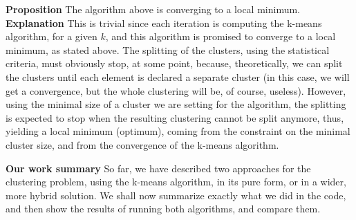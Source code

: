 \documentclass[12pt]{article}
\begin{document}
\newpage
\textbf{Proposition} The algorithm above is converging to a local minimum.\newline
\textbf{Explanation} This is trivial since each iteration is computing the k-means algorithm, for a given $k$, and this algorithm is promised to converge to a local minimum, as stated above. \newline
The splitting of the clusters, using the statistical criteria, must obviously stop, at some point, because, theoretically, we can split the clusters until each element is declared a separate cluster (in this case, we will get a convergence, but the whole clustering will be, of course, useless). However, using the minimal size of a cluster we are setting for the algorithm, the splitting is expected to stop when the resulting clustering cannot be split anymore, thus, yielding a local minimum (optimum), coming from the constraint on the minimal cluster size, and from the convergence of the k-means algorithm. \newline
\newpage

\textbf{\large Our work summary} \newline
So far, we have described two approaches for the clustering problem, using the k-means algorithm, in its pure form, or in a wider, more hybrid solution. \newline
We shall now summarize exactly what we did in the code, and then show the results of running both algorithms, and compare them. \newline
\end{document}
